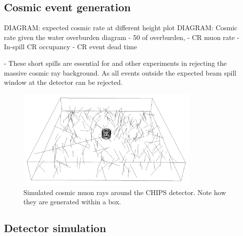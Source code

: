\subsection{Cosmic event generation} %
\label{sec:chips_monte_carlo_cosmic} %

DIAGRAM: expected cosmic rate at different height plot
DIAGRAM: Cosmic rate given the water overburden diagram
- \unit{50}{} of overburden,
- CR muon rate
- In-spill CR occupancy
- CR event dead time

- These short spills are essential for \chips and other experiments in rejecting the massive
cosmic ray background. As all events outside the expected beam spill window at the detector can be
rejected.

\begin{figure} %
    \includegraphics[width=0.8\textwidth]{diagrams/4-chips/cosmics.png}
    \caption[Cosmic muon rays around the CHIPS detector]
    {Simulated cosmic muon rays around the CHIPS detector. Note how they are generated within a
        box.}
    \label{fig:cosmics}
\end{figure}

\subsection{Detector simulation} %
\label{sec:chips_monte_carlo_sim} %

